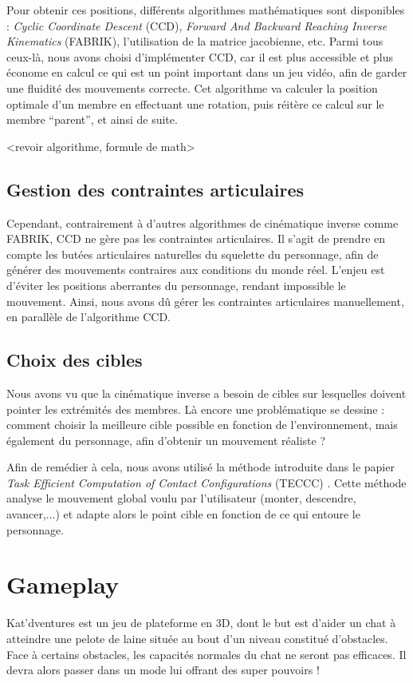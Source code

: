\documentclass[a4paper,11pt]{article}
\begin{document}
Pour obtenir ces positions, différents algorithmes mathématiques sont disponibles : \textit{Cyclic Coordinate Descent} (CCD), \textit{Forward And Backward Reaching Inverse Kinematics} (FABRIK), l'utilisation de la matrice jacobienne, etc. Parmi tous ceux-là, nous avons choisi d'implémenter CCD, car il est plus accessible et plus économe en calcul ce qui est un point important dans un jeu vidéo, afin de garder une fluidité des mouvements correcte. Cet algorithme va calculer la position optimale d'un membre en effectuant une rotation, puis réitère ce calcul sur le membre ``parent'', et ainsi de suite.

<revoir algorithme, formule de math>



\subsection{Gestion des contraintes articulaires}
Cependant, contrairement à d'autres algorithmes de cinématique inverse comme FABRIK, CCD ne gère pas les contraintes articulaires. Il s'agit de prendre en compte les butées articulaires naturelles du squelette du personnage, afin de générer des mouvements contraires aux conditions du monde réel. L'enjeu est d'éviter les positions aberrantes du personnage, rendant impossible le mouvement. Ainsi, nous avons dû gérer les contraintes articulaires manuellement, en parallèle de l'algorithme CCD.

\subsection{Choix des cibles}
Nous avons vu que la cinématique inverse a besoin de cibles sur lesquelles doivent pointer les extrémités des membres. Là encore une problématique se dessine : comment choisir la meilleure cible possible en fonction de l'environnement, mais également du personnage, afin d'obtenir un mouvement réaliste ?

Afin de remédier à cela, nous avons utilisé la méthode introduite dans le papier \textit{Task Efficient Computation of Contact Configurations}  (TECCC) \cite{tonneau:latex:14}. Cette méthode analyse le mouvement global voulu par l'utilisateur (monter, descendre, avancer,...) et adapte alors le point cible en fonction de ce qui entoure le personnage. 


\section{Gameplay}
Kat'dventures est un jeu de plateforme en 3D, dont le but est d'aider un chat à atteindre une pelote de laine située au bout d'un niveau constitué d'obstacles. Face à certains obstacles, les capacités normales du chat ne seront pas efficaces. Il devra alors passer dans un mode lui offrant des super pouvoirs !
\end{document}
